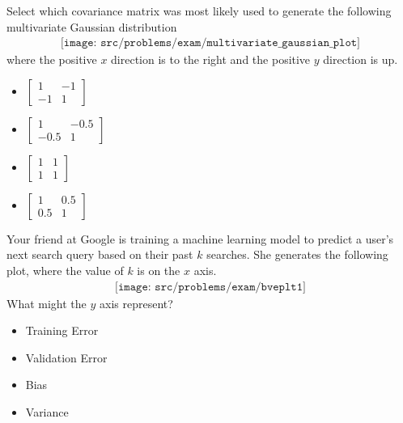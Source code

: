 \begin{Parts}
\ifexamnosol
\newpage
\fi
\Part Select which covariance matrix was most likely used to generate the following multivariate Gaussian distribution
\begin{align*}
\texttt{[image: src/problems/exam/multivariate\_gaussian\_plot]}
\end{align*}
where the positive $x$ direction is to the right and the positive $y$ direction is up.
\begin{multicols}{2}
	\begin{itemize}[label= ,itemsep=10pt, topsep=10pt, leftmargin=0pt]
		\item \mcqb $\begin{bmatrix}1&-1\\-1&1\end{bmatrix}$
		\item \mcqb $\begin{bmatrix}1&-0.5\\-0.5&1\end{bmatrix}$
		\item \mcqb $\begin{bmatrix}1&1\\1&1\end{bmatrix}$
		\item \mcqb $\begin{bmatrix}1&0.5\\0.5&1\end{bmatrix}$
	\end{itemize}
\end{multicols}

\Part Your friend at Google is training a machine learning model to predict a user's next search query based on their past $k$ searches. She generates the following plot, where the value of $k$ is on the $x$ axis.
\begin{align*}
\texttt{[image: src/problems/exam/bveplt1]}
\end{align*}
What might the $y$ axis represent?
\begin{multicols}{2}
	\begin{itemize}[label= ,itemsep=10pt, topsep=10pt, leftmargin=0pt]
		\item \mcqb Training Error
		\item \mcqb Validation Error
		\item \mcqb Bias
		\item \mcqb Variance
	\end{itemize}
\end{multicols}


\end{Parts}
